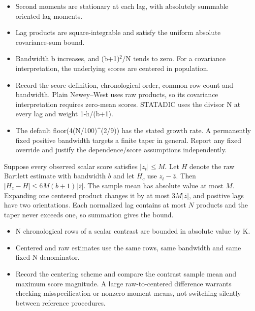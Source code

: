 \expandafter\def\csname statadic@assumptions@STATADIC-HAC-005\endcsname{\begin{itemize}
\item Second moments are stationary at each lag, with absolutely summable oriented lag moments.
\item Lag products are square-integrable and satisfy the uniform absolute covariance-sum bound.
\item Bandwidth b increases, and (b+1)\ensuremath{{}^2}/N tends to zero. For a covariance interpretation, the underlying scores are centered in population.
\end{itemize}}
\expandafter\def\csname statadic@diagnostics@STATADIC-HAC-005\endcsname{\begin{itemize}
\item Record the score definition, chronological order, common row count and bandwidth. Plain Newey–West uses raw products, so its covariance interpretation requires zero-mean scores. STATADIC uses the divisor N at every lag and weight 1-h/(b+1).
\item The default floor(4(N/100)\textasciicircum{}(2/9)) has the stated growth rate. A permanently fixed positive bandwidth targets a finite taper in general. Report any fixed override and justify the dependence/score assumptions independently.
\end{itemize}}
\expandafter\def\csname statadic@statement@STATADIC-HAC-006\endcsname{Suppose every observed scalar score satisfies $|z_t|\le M$.
  Let $H$ denote the raw Bartlett estimate with bandwidth $b$ and let $H_c$
  use $z_t-\bar z$. Then $|H_c-H|\le 6M(b+1)|\bar z|$.}
\expandafter\def\csname statadic@proof@STATADIC-HAC-006\endcsname{The sample mean has absolute value at most $M$. Expanding one
  centered product changes it by at most $3M|\bar z|$, and positive lags have
  two orientations. Each normalized lag contains at most $N$ products and the
  taper never exceeds one, so summation gives the bound.}
\expandafter\def\csname statadic@assumptions@STATADIC-HAC-006\endcsname{\begin{itemize}
\item N chronological rows of a scalar contrast are bounded in absolute value by K.
\item Centered and raw estimates use the same rows, same bandwidth and same fixed-N denominator.
\end{itemize}}
\expandafter\def\csname statadic@diagnostics@STATADIC-HAC-006\endcsname{\begin{itemize}
\item Record the centering scheme and compare the contrast sample mean and maximum score magnitude. A large raw-to-centered difference warrants checking misspecification or nonzero moment means, not switching silently between reference procedures.
\end{itemize}}
